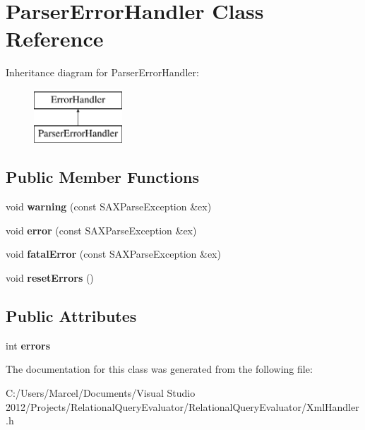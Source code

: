 \hypertarget{class_parser_error_handler}{\section{Parser\+Error\+Handler Class Reference}
\label{class_parser_error_handler}
}
Inheritance diagram for Parser\+Error\+Handler\+:\begin{figure}[H]
\begin{center}
\leavevmode
\includegraphics[height=2.000000cm]{class_parser_error_handler}
\end{center}
\end{figure}
\subsection*{Public Member Functions}
\begin{DoxyCompactItemize}
\item 
\hypertarget{class_parser_error_handler_aa63a6f504a4524985be39e0cdfa4e630}{void {\bfseries warning} (const S\+A\+X\+Parse\+Exception \&ex)}\label{class_parser_error_handler_aa63a6f504a4524985be39e0cdfa4e630}

\item 
\hypertarget{class_parser_error_handler_aa636e61f4f0fb47f38151e09c3711ee7}{void {\bfseries error} (const S\+A\+X\+Parse\+Exception \&ex)}\label{class_parser_error_handler_aa636e61f4f0fb47f38151e09c3711ee7}

\item 
\hypertarget{class_parser_error_handler_a95dede361c7ef584c9a732ca716c61a4}{void {\bfseries fatal\+Error} (const S\+A\+X\+Parse\+Exception \&ex)}\label{class_parser_error_handler_a95dede361c7ef584c9a732ca716c61a4}

\item 
\hypertarget{class_parser_error_handler_afcd94fcf4b801a4767a90b88721b432c}{void {\bfseries reset\+Errors} ()}\label{class_parser_error_handler_afcd94fcf4b801a4767a90b88721b432c}

\end{DoxyCompactItemize}
\subsection*{Public Attributes}
\begin{DoxyCompactItemize}
\item 
\hypertarget{class_parser_error_handler_a1929eecf90414ca41886580f1d61248f}{int {\bfseries errors}}\label{class_parser_error_handler_a1929eecf90414ca41886580f1d61248f}

\end{DoxyCompactItemize}


The documentation for this class was generated from the following file\+:\begin{DoxyCompactItemize}
\item 
C\+:/\+Users/\+Marcel/\+Documents/\+Visual Studio 2012/\+Projects/\+Relational\+Query\+Evaluator/\+Relational\+Query\+Evaluator/Xml\+Handler.\+h\end{DoxyCompactItemize}

